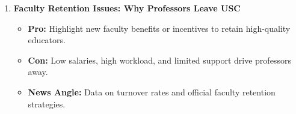 \documentclass{article}
\begin{document}
\begin{enumerate}[leftmargin=*]
    \item \textbf{Faculty Retention Issues: Why Professors Leave USC}
    \begin{itemize}
        \item \textbf{Pro:} Highlight new faculty benefits or incentives to retain high-quality educators.
        \item \textbf{Con:} Low salaries, high workload, and limited support drive professors away.
        \item \textbf{News Angle:} Data on turnover rates and official faculty retention strategies.
    \end{itemize}
\end{enumerate}
\end{document}
